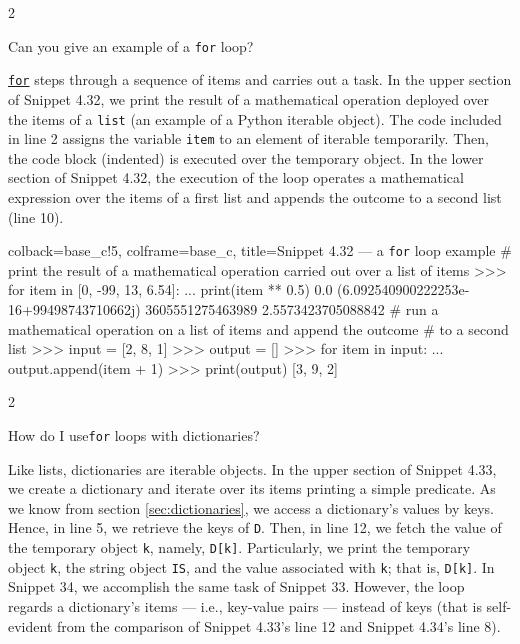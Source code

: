 \documentclass[a4paper,11pt]{book}
\newcommand{\question}[1]{%
    \begin{tcolorbox}[colback=comp_c!10,colframe=comp_c,sidebyside align=top,width=\linewidth,before skip=1ex]
        #1
    \end{tcolorbox}
    \switchcolumn%
}
\newcommand{\note}[1]{%
    \begin{tcolorbox}[colback=white!0,colframe=white!10,width=\linewidth,before skip=1ex]
        #1
    \end{tcolorbox}
}
\begin{document}
\begin{paracol}{2}
	\question{\raggedright Can you give an example of a \texttt{for} loop?}
	\note{\href{https://docs.python.org/3/reference/compound_stmts.html\#for}{\texttt{for}} steps through a sequence of items and carries out a task. In the upper section of Snippet 4.32, we print the result of a mathematical operation deployed over the items of a \texttt{list} (an example of a Python iterable object). The code included in line 2 assigns the variable \texttt{item} to an element of iterable temporarily. Then, the code block (indented) is executed over the temporary object. In the lower section of Snippet 4.32, the execution of the loop operates a mathematical expression over the items of a first list and appends the outcome to a second list (line 10).}
\end{paracol}

\begin{pythoncode}[linenos=true,]{colback=base_c!5, colframe=base_c, title=\sffamily Snippet 4.32 --- a \texttt{for} loop example}
# print the result of a mathematical operation carried out over a list of items
>>> for item in [0, -99, 13, 6.54]:
...     print(item ** 0.5)  
0.0
(6.092540900222253e-16+99498743710662j)
3605551275463989
2.5573423705088842   
# run a mathematical operation on a list of items and append the outcome 
# to a second list 
>>> input = [2, 8, 1]
>>> output = []
>>> for item in input:
...    output.append(item + 1)
>>> print(output)
[3, 9, 2]
\end{pythoncode}
\clearpage
	
\begin{paracol}{2}
	\question{\raggedright How do I use\texttt{for} loops with dictionaries?}
	\note{Like lists, dictionaries are iterable objects. In the upper section of Snippet 4.33, we create a dictionary and iterate over its items printing a simple predicate. As we know from section \ref{sec:dictionaries}, we access a dictionary's values by keys. Hence, in line 5, we retrieve the keys of \texttt{D}. Then, in line 12, we fetch the value of the temporary object \texttt{k}, namely, \texttt{D[k]}. Particularly, we print the temporary object \texttt{k}, the string object \texttt{IS}, and the value associated with \texttt{k}; that is, \texttt{D[k]}. In Snippet 34, we accomplish the same task of Snippet 33. However, the loop regards a dictionary's items --- i.e., key-value pairs --- instead of keys (that is self-evident from the comparison of Snippet 4.33's line 12 and Snippet 4.34's line 8). }
\end{paracol}
\end{document}
